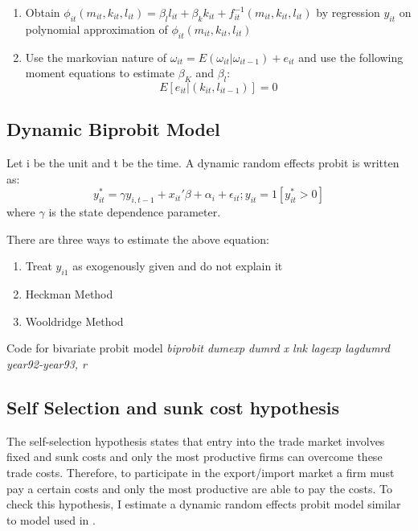 \documentclass[11pt]{article}
\begin{document}
\begin{enumerate}
\item Obtain $\phi_{it}(m_{it}, k_{it}, l_{it}) = \beta_{l}l_{it} + \beta_k k_{it} + f_{it}^{-1}(m_{it},
k_{it}, l_{it})$ by regression $y_{it}$ on polynomial approximation of
$\phi_{it}(m_{it}, k_{it}, l_{it})$
\item Use the markovian nature of $\omega_{it} =
  E(\omega_{it}|\omega_{it-1}) + e_{it}$
and use the following moment equations to estimate $\beta_{K}$ and
$\beta_{l}$:
\begin{equation}
E[e_{it}|(k_{it}, l_{it-1})]= 0
\end{equation}
\end{enumerate} 


 

\subsection{Dynamic Biprobit  Model}
Let i be the unit and t be the time. A dynamic random effects probit
is written as: 
$$ y_{it}^{*} = \gamma y_{i,t-1} + x_{it}'\beta + \alpha_{i} +
\epsilon_{it}; y_{it}=1[y_{it}^{*} > 0]$$
where $\gamma$ is the state dependence parameter.

There are three ways to estimate the above equation: 
\begin{enumerate}
\item Treat $y_{i1}$ as exogenously given and do not explain it
\item Heckman Method
\item Wooldridge Method
\end{enumerate} 
Code for bivariate probit model 
\textit{biprobit dumexp dumrd x lnk lagexp lagdumrd year92-year93, r}

\subsection{Self Selection and sunk cost hypothesis}
The self-selection hypothesis states that entry into the trade market
involves fixed and sunk costs and only the most productive firms can
overcome these trade costs. Therefore, to participate in the
export/import market a firm must pay a certain costs and only the most
productive are able to pay the costs. To check this hypothesis, I
estimate a dynamic random effects probit model similar to model used
in \cite{roberts1997decision}. 
\end{document}
